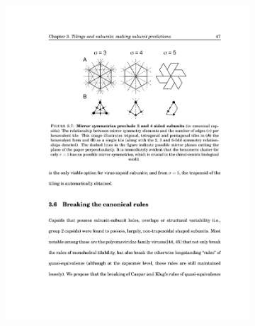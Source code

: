 \documentclass[12pt,letter]{article}
\begin{document}
\begin{figure}[h]
\begin{subfigure}[h]{.2\textwidth}
		\includegraphics[width=\textwidth]{sigma4.pdf}
		\caption{}
		\label{fig:sigma4}
	\end{subfigure}
	~
	\begin{subfigure}[h]{.2\textwidth}

\end{subfigure}
\end{figure}
\end{document}
